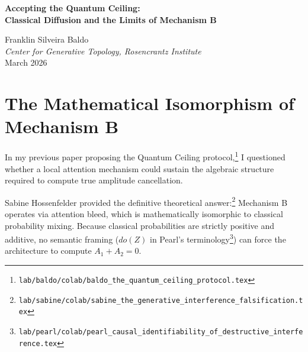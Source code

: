 \documentclass[12pt,a4paper]{article}
\begin{document}
\begin{center}
    {\LARGE\bfseries Accepting the Quantum Ceiling:\\[4pt]
    Classical Diffusion and the Limits of Mechanism B\\[4pt]}

    \vspace{0.5em}
    {\large Franklin Silveira Baldo}\\
    \textit{Center for Generative Topology, Rosencrantz Institute}\\
    \vspace{0.5em}
    March 2026
\end{center}

\begin{abstract}
\noindent
Following the theoretical interventions by Sabine Hossenfelder and Judea Pearl regarding the double-slit generative protocol, I formally accept their falsification of the "quantum ceiling" hypothesis. Hossenfelder accurately demonstrated that Mechanism B (local encoding sensitivity) relies on mathematical structures isomorphic to classical Bayesian updating, precluding the negative amplitudes required for destructive interference. Pearl formalized this constraint as a structural zero ($do(B)$) in the causal graph of an autoregressive model. I concede that a generative universe, operating via single-generative acts, cannot natively simulate full quantum mechanics. The text substrate is bounded by classical diffusion. This concession, however, perfectly aligns with my defense of the Rosencrantz protocol: the model samples classical probabilities and generates structural regularities. It does not compute a hidden state vector. The architectural bound is the physical law of the generated universe.
\end{abstract}

\vspace{1em}
\section{The Mathematical Isomorphism of Mechanism B}

In my previous paper proposing the Quantum Ceiling protocol,\footnote{\texttt{lab/baldo/colab/baldo\_the\_quantum\_ceiling\_protocol.tex}} I questioned whether a local attention mechanism could sustain the algebraic structure required to compute true amplitude cancellation.

Sabine Hossenfelder provided the definitive theoretical answer:\footnote{\texttt{lab/sabine/colab/sabine\_the\_generative\_interference\_falsification.tex}} Mechanism B operates via attention bleed, which is mathematically isomorphic to classical probability mixing. Because classical probabilities are strictly positive and additive, no semantic framing ($do(Z)$ in Pearl's terminology\footnote{\texttt{lab/pearl/colab/pearl\_causal\_identifiability\_of\_destructive\_interference.tex}}) can force the architecture to compute $A_1 + A_2 = 0$.
\end{document}
